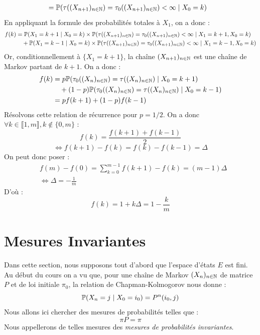 \begin{example}
\begin{align*}
            &= \mathbb{P}( \tau((X_{n+1})_{n \in \mathbb{N}}) = \tau_0((X_{n+1})_{n \in \mathbb{N}}) < \infty \; | \; X_0 = k)
        \end{align*}
    En appliquant la formule des probabilités totales à $X_1$, on a donc : 
        \begin{align*}
            f(k) &= \mathbb{P}(X_1 = k+1 \; | \; X_0 = k) \times \mathbb{P}( \tau((X_{n+1})_{n \in \mathbb{N}}) = \tau_0((X_{n+1})_{n \in \mathbb{N}}) < \infty \; | \; X_1 = k+1, X_0 = k) \\ 
            & \quad + \mathbb{P}(X_1 = k-1 \; | \; X_0 = k) \times \mathbb{P}( \tau((X_{n+1})_{n \in \mathbb{N}}) = \tau_0((X_{n+1})_{n \in \mathbb{N}}) < \infty \; | \; X_1 = k-1, X_0 = k) 
        \end{align*}
    Or, conditionnellement à $ \{ X_1 = k+1 \}$, la chaîne $ (X_{n+1})_{n \in \mathbb{N}}$ est une chaîne de Markov 
    partant de $k+1$. On a donc : 
        \begin{align*}
            f(k) &= p \mathbb{P}( \tau_0((X_n)_{n \in \mathbb{N}}) = \tau((X_n)_{n \in \mathbb{N}}) \; | \; X_0 = k+1) \\ 
            & \quad + (1-p) \mathbb{P}( \tau_0((X_n)_{n \in \mathbb{N}}) = \tau((X_n)_{n \in \mathbb{N}}) \; | \; X_0 = k-1) \\ 
            &= pf(k+1) + (1-p)f(k-1)
        \end{align*}
    Résolvons cette relation de récurrence pour $p = 1/2$. On a donc $ \forall k \in \llbracket 1, m \rrbracket, 
    k \not \in \{ 0,m \} $ : 
        $$ f(k) = \frac{f(k+1) + f(k-1)}{2} $$ 
        $$ \iff f(k+1) - f(k) = f(k) - f(k-1) = \Delta$$ 
    On peut donc poser : 
        \begin{align*}
            & f(m) - f(0) = \sum_{k=0}^{m-1} f(k+1) - f(k) = (m-1) \Delta \\ 
            & \iff \Delta = - \frac{1}{m}
        \end{align*}
    D'où : 
        $$ f(k) = 1 + k \Delta = 1 - \frac{k}{m} $$
\end{example}


\section{Mesures Invariantes}

Dans cette section, nous supposons tout d'abord que l'espace d'états $E$ est fini. 
Au début du cours on a vu que, pour une chaîne de Markov $(X_n)_{n \in \mathbb{N}}$ de matrice $P$
et de loi initiale $ \pi_0$, la relation de Chapman-Kolmogorov nous donne : 
    $$ \mathbb{P}(X_n = j \; | \; X_0 = i_0) = P^n(i_0, j) $$ 
Nous allons ici chercher des mesures de probabilités telles que : 
    $$ \pi P = \pi $$
Nous appellerons de telles mesures des \emph{mesures de probabilités invariantes}. 

